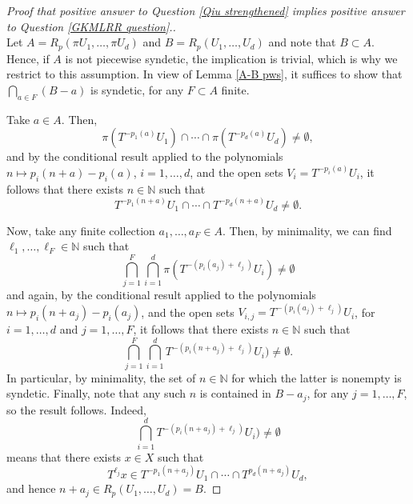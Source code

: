 \documentclass[10pt,a4paper]{amsart}
\def\N{{\mathbb N}}
\begin{document}
\begin{proof}[Proof that positive answer to Question \ref{Qiu strengthened} implies positive answer to Question \ref{GKMLRR question}.]
\ \\
Let $A=R_p(\pi U_1,\ldots,\pi U_d )$ and $B=R_p(U_1,\ldots,U_d)$ 
and note that $B\subset A$. Hence, if $A$ is not piecewise 
syndetic, the implication is trivial, which is why we restrict to 
this assumption.
In view of Lemma \ref{A-B pws}, it suffices to show that 
$\bigcap_{a\in F} (B-a)$ is syndetic, for any $F\subset A$ finite. 

Take $a\in A$. Then, 
$$\pi(T^{-p_1(a)}U_1) \cap \cdots \cap \pi(T^{-p_d(a)}U_d) \neq \emptyset,$$
and by the conditional result applied to the polynomials $n\mapsto p_i(n+a)-p_i(a)$, $i=1,\ldots,d$, and the open sets $V_i=T^{-p_i(a)}U_i$, it follows that there exists $n\in \N$ such that
$$T^{-p_1(n+a)}U_1 \cap \cdots \cap T^{-p_d(n+a)}U_d \neq \emptyset. $$

Now, take any finite collection $a_1,\ldots,a_F \in A$. Then, by 
minimality, we can find
$\ell_1,\ldots,\ell_{F}\in \N$ such that 
$$\bigcap_{j=1}^{F} \bigcap_{i=1}^{d}  \pi(T^{-(p_i(a_j)+ \ell_j)}U_i) \neq \emptyset$$
and again, by the conditional result applied to the polynomials $n\mapsto p_i(n+a_j)-p_i(a_j)$, and the open sets $V_{i,j}=T^{-(p_i(a_j)+ \ell_j)}U_i$, for $i=1,\ldots,d$ and $j=1,\ldots,F$, it follows that there exists $n\in \N$ such that
$$\bigcap_{j=1}^{F} \bigcap_{i=1}^{d}  T^{-(p_i(n+a_j)+ \ell_j)}U_i) \neq \emptyset.$$ 
In particular, by minimality, the set of $n\in \N$ for which the latter is nonempty is syndetic. Finally, note that any such $n$ is contained in $B-a_j$, for any $j=1,\ldots,F$, so the result follows. Indeed, 
$$\bigcap_{i=1}^{d}  T^{-(p_i(n+a_j)+ \ell_j)}U_i) \neq \emptyset$$
means that there exists $x\in X$ such that 
$$T^{\ell_j}x \in T^{-p_1(n+a_j)}U_1 \cap \cdots \cap T^{p_d(n+a_j)}U_d,$$
and hence $n+a_j\in R_p(U_1,\ldots,U_d)=B$.
\end{proof}
\end{document}
